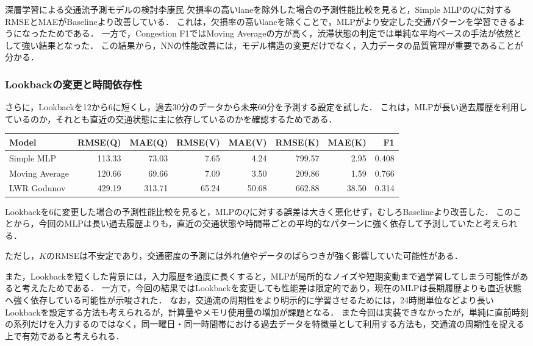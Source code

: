 \begin{column}{深層学習による交通流予測モデルの検討}{李康民}
欠損率の高いlaneを除外した場合の予測性能比較を見ると，Simple MLPの$Q$に対するRMSEとMAEがBaselineより改善している．
これは，欠損率の高いlaneを除くことで，MLPがより安定した交通パターンを学習できるようになったためである．
一方で，Congestion F1ではMoving Averageの方が高く，渋滞状態の判定では単純な平均ベースの手法が依然として強い結果となった．
この結果から，NNの性能改善には，モデル構造の変更だけでなく，入力データの品質管理が重要であることが分かる．

\subsubsection*{Lookbackの変更と時間依存性}

さらに，Lookbackを12から6に短くし，過去30分のデータから未来60分を予測する設定を試した．
これは，MLPが長い過去履歴を利用しているのか，それとも直近の交通状態に主に依存しているのかを確認するためである．

\begin{center}
\begin{minipage}{0.98\linewidth}
\centering
\scriptsize
\setlength{\tabcolsep}{3pt}
\renewcommand{\arraystretch}{1.15}
\label{tab:lookback-comparison}
\begin{tabular}{lrrrrrrr}
  \toprule
  Model & RMSE(Q) & MAE(Q) & RMSE(V) & MAE(V) & RMSE(K) & MAE(K) & F1 \\
  \midrule
  Simple MLP     & 113.33 & 73.03 & 7.65 & 4.24 & 799.57 & 2.95 & 0.408 \\
  Moving Average & 120.66 & 69.66 & 7.09 & 3.50 & 209.86 & 1.59 & 0.766 \\
  LWR Godunov    & 429.19 & 313.71 & 65.24 & 50.68 & 662.88 & 38.50 & 0.314 \\
  \bottomrule
\end{tabular}
\end{minipage}
\end{center}

Lookbackを6に変更した場合の予測性能比較を見ると，MLPの$Q$に対する誤差は大きく悪化せず，むしろBaselineより改善した．
このことから，今回のMLPは長い過去履歴よりも，直近の交通状態や時間帯ごとの平均的なパターンに強く依存して予測していたと考えられる．

ただし，$K$のRMSEは不安定であり，交通密度の予測には外れ値やデータのばらつきが強く影響していた可能性がある．

また，Lookbackを短くした背景には，入力履歴を過度に長くすると，MLPが局所的なノイズや短期変動まで過学習してしまう可能性があると考えたためである．
一方で，今回の結果ではLookbackを変更しても性能差は限定的であり，現在のMLPは長期履歴よりも直近状態へ強く依存している可能性が示唆された．
なお，交通流の周期性をより明示的に学習させるためには，24時間単位などより長いLookbackを設定する方法も考えられるが，計算量やメモリ使用量の増加が課題となる．
また今回は実装できなかったが，単純に直前時刻の系列だけを入力するのではなく，同一曜日・同一時間帯における過去データを特徴量として利用する方法も，交通流の周期性を捉える上で有効であると考えられる．


\end{column}
